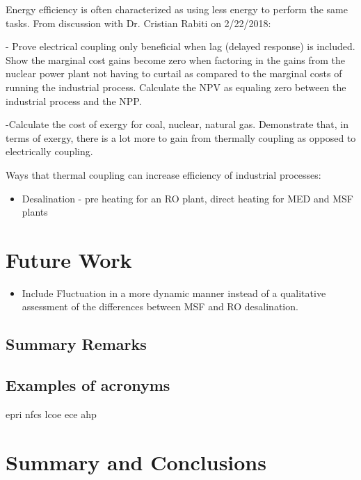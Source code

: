 \documentclass[12pt]{UIdahoMastersThesis}
\begin{document}
Energy efficiency is often characterized as using less energy to perform the same tasks.
From discussion with Dr. Cristian Rabiti on 2/22/2018:

- Prove electrical coupling only beneficial when lag (delayed response) is included.  Show the marginal cost gains become zero when factoring in the gains from the nuclear power plant not having to curtail as compared to the marginal costs of running the industrial process. Calculate the NPV as equaling zero between the industrial process and the NPP.

-Calculate the cost of exergy for coal, nuclear, natural gas.  Demonstrate that, in terms of exergy, there is a lot more to gain from thermally coupling as opposed to electrically coupling.

Ways that thermal coupling can increase efficiency of industrial processes:
\begin{itemize}
\item Desalination - pre heating for an RO plant, direct heating for MED and MSF plants
\end{itemize}



\chapter{Future Work}
\begin{itemize}
\item Include Fluctuation in a more dynamic manner instead of a qualitative assessment of the differences between MSF and RO desalination.
\end{itemize}



\section{Summary Remarks}


\section{Examples of acronyms}
\ac{epri}
\ac{nfcs}
\ac{lcoe}
\ac{ece}
\ac{ahp}



\chapter{Summary and Conclusions}
\label{Chapter:SummaryAndConclusions}
\end{document}
